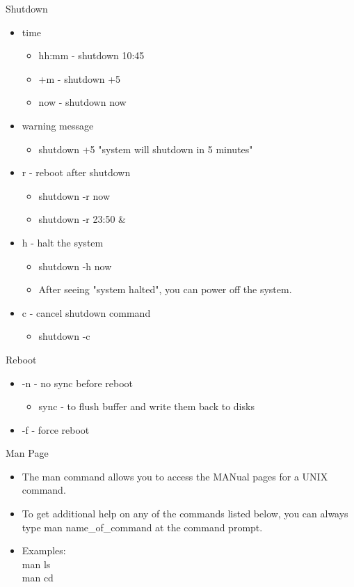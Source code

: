 \documentclass{beamer}
\begin{document}
\begin{frame}{Shutdown}
\begin{itemize}
\item time
\begin{itemize}
\item hh:mm - shutdown 10:45
\item +m - shutdown +5
\item now - shutdown now
\end{itemize}
\item warning message
\begin{itemize}
\item shutdown +5 "system will shutdown in 5 minutes"
\end{itemize}
\item r - reboot after shutdown
\begin{itemize}
\item shutdown -r now
\item shutdown -r 23:50 \&
\end{itemize}
\item h - halt the system
\begin{itemize}
\item shutdown -h now
\item After seeing "system halted", you can power off the system.
\end{itemize}
\item c - cancel shutdown command
\begin{itemize}
\item shutdown -c
\end{itemize}
\end{itemize}
\end{frame}

\begin{frame}{Reboot}
\begin{itemize}
\item -n - no sync before reboot
\begin{itemize}
\item sync - to flush buffer and write them back to disks
\end{itemize}
\item -f - force reboot
\end{itemize}
\end{frame}

\begin{frame}{Man Page}
\begin{itemize}
\item The man command allows you to access the MANual pages for a UNIX command.
\item To get additional help on any of the commands listed below, you can always type man name\_of\_command at the command prompt.
\item Examples:\\
man ls \\
man cd
\end{itemize}
\end{frame}
\end{document}
